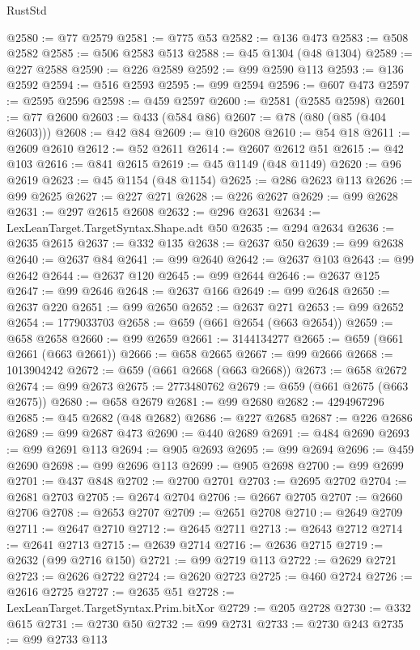 \begin{lexlean}{RustStd}
\begin{coremodule}
@2580 := @77 @2579
@2581 := @775 @53
@2582 := @136 @473
@2583 := @508 @2582
@2585 := @506 @2583 @513
@2588 := @45 @1304 (@48 @1304)
@2589 := @227 @2588
@2590 := @226 @2589
@2592 := @99 @2590 @113
@2593 := @136 @2592
@2594 := @516 @2593
@2595 := @99 @2594
@2596 := @607 @473
@2597 := @2595 @2596
@2598 := @459 @2597
@2600 := @2581 (@2585 @2598)
@2601 := @77 @2600
@2603 := @433 (@584 @86)
@2607 := @78 (@80 (@85 (@404 @2603)))
@2608 := @42 @84
@2609 := @10 @2608
@2610 := @54 @18
@2611 := @2609 @2610
@2612 := @52 @2611
@2614 := @2607 @2612 @51
@2615 := @42 @103
@2616 := @841 @2615
@2619 := @45 @1149 (@48 @1149)
@2620 := @96 @2619
@2623 := @45 @1154 (@48 @1154)
@2625 := @286 @2623 @113
@2626 := @99 @2625
@2627 := @227 @271
@2628 := @226 @2627
@2629 := @99 @2628
@2631 := @297 @2615 @2608
@2632 := @296 @2631
@2634 := LexLeanTarget.TargetSyntax.Shape.adt @50
@2635 := @294 @2634
@2636 := @2635 @2615
@2637 := @332 @135
@2638 := @2637 @50
@2639 := @99 @2638
@2640 := @2637 @84
@2641 := @99 @2640
@2642 := @2637 @103
@2643 := @99 @2642
@2644 := @2637 @120
@2645 := @99 @2644
@2646 := @2637 @125
@2647 := @99 @2646
@2648 := @2637 @166
@2649 := @99 @2648
@2650 := @2637 @220
@2651 := @99 @2650
@2652 := @2637 @271
@2653 := @99 @2652
@2654 := 1779033703
@2658 := @659 (@661 @2654 (@663 @2654))
@2659 := @658 @2658
@2660 := @99 @2659
@2661 := 3144134277
@2665 := @659 (@661 @2661 (@663 @2661))
@2666 := @658 @2665
@2667 := @99 @2666
@2668 := 1013904242
@2672 := @659 (@661 @2668 (@663 @2668))
@2673 := @658 @2672
@2674 := @99 @2673
@2675 := 2773480762
@2679 := @659 (@661 @2675 (@663 @2675))
@2680 := @658 @2679
@2681 := @99 @2680
@2682 := 4294967296
@2685 := @45 @2682 (@48 @2682)
@2686 := @227 @2685
@2687 := @226 @2686
@2689 := @99 @2687 @473
@2690 := @440 @2689
@2691 := @484 @2690
@2693 := @99 @2691 @113
@2694 := @905 @2693
@2695 := @99 @2694
@2696 := @459 @2690
@2698 := @99 @2696 @113
@2699 := @905 @2698
@2700 := @99 @2699
@2701 := @437 @848
@2702 := @2700 @2701
@2703 := @2695 @2702
@2704 := @2681 @2703
@2705 := @2674 @2704
@2706 := @2667 @2705
@2707 := @2660 @2706
@2708 := @2653 @2707
@2709 := @2651 @2708
@2710 := @2649 @2709
@2711 := @2647 @2710
@2712 := @2645 @2711
@2713 := @2643 @2712
@2714 := @2641 @2713
@2715 := @2639 @2714
@2716 := @2636 @2715
@2719 := @2632 (@99 @2716 @150)
@2721 := @99 @2719 @113
@2722 := @2629 @2721
@2723 := @2626 @2722
@2724 := @2620 @2723
@2725 := @460 @2724
@2726 := @2616 @2725
@2727 := @2635 @51
@2728 := LexLeanTarget.TargetSyntax.Prim.bitXor
@2729 := @205 @2728
@2730 := @332 @615
@2731 := @2730 @50
@2732 := @99 @2731
@2733 := @2730 @243
@2735 := @99 @2733 @113

\end{coremodule}
\end{lexlean}
